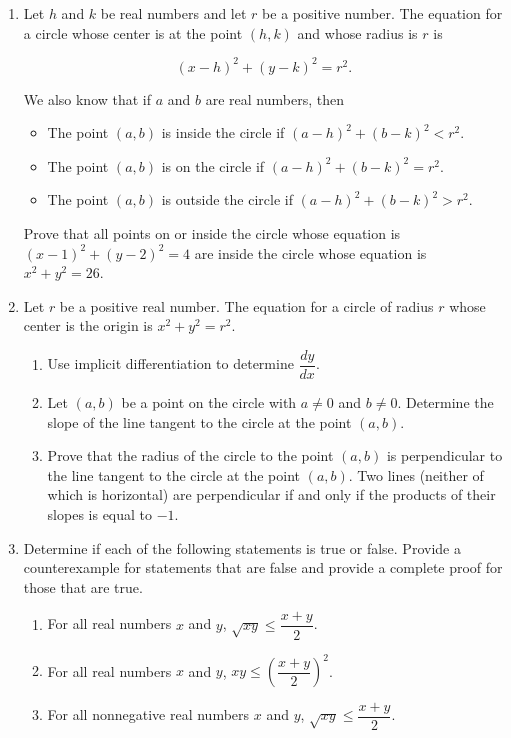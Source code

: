 \begin{enumerate}
\item Let $h$ and $k$ be real numbers and let $r$ be a positive number.  The equation for a circle whose center is at the point $\left( h, k \right)$ and whose radius is $r$ is
\label{exer:circle-31}%

\[
\left( x - h \right)^2 + \left( y - k \right)^2 = r^2.
\]

\noindent
We also know that if $a$ and $b$ are real numbers, then

\begin{itemize}
\item The point $\left( a, b \right)$ is inside the circle if 
$\left( a - h \right)^2 + \left( b - k \right)^2 < r^2$.
\item The point $\left( a, b \right)$ is on the circle if 
$\left( a - h \right)^2 + \left( b - k \right)^2 = r^2$.
\item The point $\left( a, b \right)$ is outside the circle if 
$\left( a - h \right)^2 + \left( b - k \right)^2 > r^2$.
\end{itemize}

\noindent
Prove that all points on or inside the circle whose equation is 
$\left( x - 1 \right)^2 + \left( y - 2 \right)^2 = 4$ are inside the circle whose equation is 
$x^2 + y^2 = 26$.


\item \label{exer:insidecircle} Let $r$ be a positive real number. The equation for a circle of radius $r$ whose center is the origin is $x^2 + y^2 = r^2$.

\begin{enumerate}
\item Use implicit differentiation to determine $\dfrac{dy}{dx}$.

\item Let $\left(a, b \right)$ be a point on the circle with $a \ne 0$ and $b \ne 0$.  Determine the slope of the line tangent to the circle at the point $\left(a, b \right)$.

\item Prove that the radius of the circle to the point $\left(a, b \right)$ is perpendicular to the line tangent to the circle at the point $\left(a, b \right)$. \hint Two lines (neither of which is horizontal) are perpendicular if and only if the products of their slopes is equal to $-1$.
\end{enumerate}

\item Determine if each of the following statements is true or false.  Provide a counterexample for statements that are false and provide a complete proof for those that are true. 
\label{exer:AGM}%
\begin{enumerate}
\item For all real numbers $x$ and $y$, $\sqrt{xy} \leq \dfrac{x + y}{2}$.
\item For all real numbers $x$ and $y$, $xy \leq \left( \dfrac{x + y}{2} \right)^2$.
\item For all nonnegative real numbers $x$ and $y$, $\sqrt{xy} \leq \dfrac{x + y}{2}$.
\end{enumerate}


\end{enumerate}
